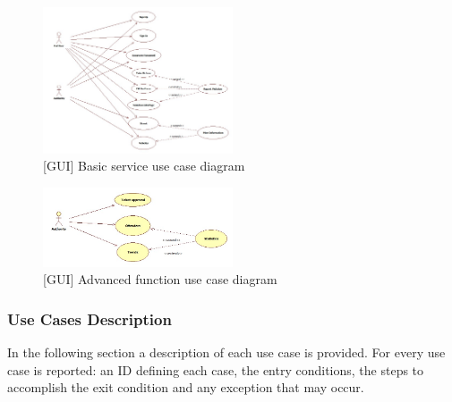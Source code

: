  \begin{figure}[H]
		\centering
      \includegraphics[width=0.5\textwidth]{GUI/BasicServiceUseCase.jpg}
      \caption{[GUI] Basic service use case diagram}   \label{fig:BasicService}
\end{figure}

 \begin{figure}[H]
		\centering
      \includegraphics[width=0.5\textwidth]{GUI/Advanced FunUseCase.jpg}
      \caption{[GUI] Advanced function use case diagram}   \label{fig:AdvancedFunction}
\end{figure}


\subsubsection{Use Cases Description}
In the following section a description of each use case is provided. For every use case is reported: an ID defining each case, the entry conditions, the steps to accomplish the exit condition and any exception that may occur. \\


